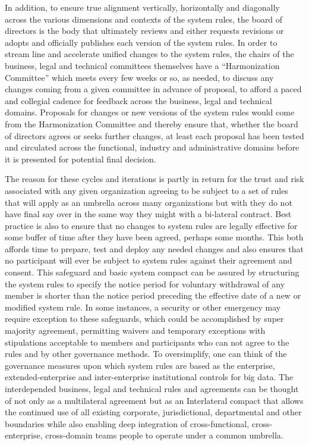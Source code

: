 In addition, to ensure true alignment vertically, horizontally and diagonally across the various dimensions and contexts of the system rules, the board of directors is the body that ultimately reviews and either requests revisions or adopts and officially publishes each version of the system rules.
In order to stream line and accelerate unified changes to the system rules, the chairs of the business, legal and technical committees themselves have a “Harmonization Committee” which meets every few weeks or so, as needed, to discuss any changes coming from a given committee in advance of proposal, to afford a paced and collegial cadence for feedback across the business, legal and technical domains.
Proposals for changes or new versions of the system rules would come from the Harmonization Committee and thereby ensure that, whether the board of directors agrees or seeks further changes, at least each proposal has been tested and circulated across the functional, industry and administrative domains before it is presented for potential final decision.

The reason for these cycles and iterations is partly in return for the trust and risk associated with any given organization agreeing to be subject to a set of rules that will apply as an umbrella across many organizations but with they do not have final say over in the same way they might with a bi-lateral contract.
Best practice is also to ensure that no changes to system rules are legally effective for some buffer of time after they have been agreed, perhaps some months.
This both affords time to prepare, test and deploy any needed changes and also ensures that no participant will ever be subject to system rules against their agreement and consent.
This safeguard and basic system compact can be assured by structuring the system rules to specify the notice period for voluntary withdrawal of any member is shorter than the notice period preceding the effective date of a new or modified system rule.
In some instances, a security or other emergency may require exception to these safeguards, which could be accomplished by super majority agreement, permitting waivers and temporary exceptions with stipulations acceptable to members and participants who can not agree to the rules and by other governance methods.
To oversimplify, one can think of the governance measures upon which system rules are based as the enterprise, extended-enterprise and inter-enterprise institutional controls for big data.
The interdepended business, legal and technical rules and agreements can be thought of not only as a multilateral agreement but as an Interlateral compact that allows the continued use of all existing corporate, jurisdictional, departmental and other boundaries while also enabling deep integration of cross-functional, cross-enterprise, cross-domain teams people to operate under a common umbrella.

